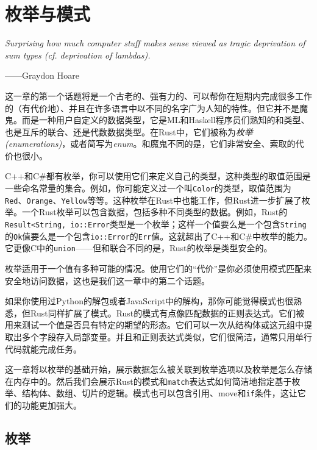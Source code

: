 \chapter{枚举与模式}\label{ch10}

\emph{Surprising how much computer stuff makes sense viewed as tragic deprivation of sum types (cf. deprivation of lambdas).}

\begin{flushright}
    ——Graydon Hoare
\end{flushright}

这一章的第一个话题将是一个古老的、强有力的、可以帮你在短期内完成很多工作的（有代价地）、并且在许多语言中以不同的名字广为人知的特性。但它并不是魔鬼。而是一种用户自定义的数据类型，它是ML和Haskell程序员们熟知的和类型、也是互斥的联合、还是代数数据类型。在Rust中，它们被称为\emph{枚举(enumerations)}，或者简写为\emph{enum}。和魔鬼不同的是，它们非常安全、索取的代价也很小。

C++和C\#都有枚举，你可以使用它们来定义自己的类型，这种类型的取值范围是一些命名常量的集合。例如，你可能定义过一个叫\texttt{Color}的类型，取值范围为\texttt{Red}、\texttt{Orange}、\texttt{Yellow}等等。这种枚举在Rust中也能工作，但Rust进一步扩展了枚举。一个Rust枚举可以包含数据，包括多种不同类型的数据。例如，Rust的\texttt{Result<String, io::Error}类型是一个枚举；这样一个值要么是一个包含\texttt{String}的\texttt{Ok}值要么是一个包含\texttt{io::Error}的\texttt{Err}值。这就超出了C++和C\#中枚举的能力。它更像C中的\texttt{union}——但和联合不同的是，Rust的枚举是类型安全的。

枚举适用于一个值有多种可能的情况。使用它们的“代价”是你必须使用模式匹配来安全地访问数据，这也是我们这一章中的第二个话题。

如果你使用过Python的解包或者JavaScript中的解构，那你可能觉得模式也很熟悉，但Rust同样扩展了模式。Rust的模式有点像匹配数据的正则表达式。它们被用来测试一个值是否具有特定的期望的形态。它们可以一次从结构体或这元组中提取出多个字段存入局部变量。并且和正则表达式类似，它们很简洁，通常只用单行代码就能完成任务。

这一章将以枚举的基础开始，展示数据怎么被关联到枚举选项以及枚举是怎么存储在内存中的。然后我们会展示Rust的模式和\texttt{match}表达式如何简洁地指定基于枚举、结构体、数组、切片的逻辑。模式也可以包含引用、move和\texttt{if}条件，这让它们的功能更加强大。

\section{枚举}\label{enum}

